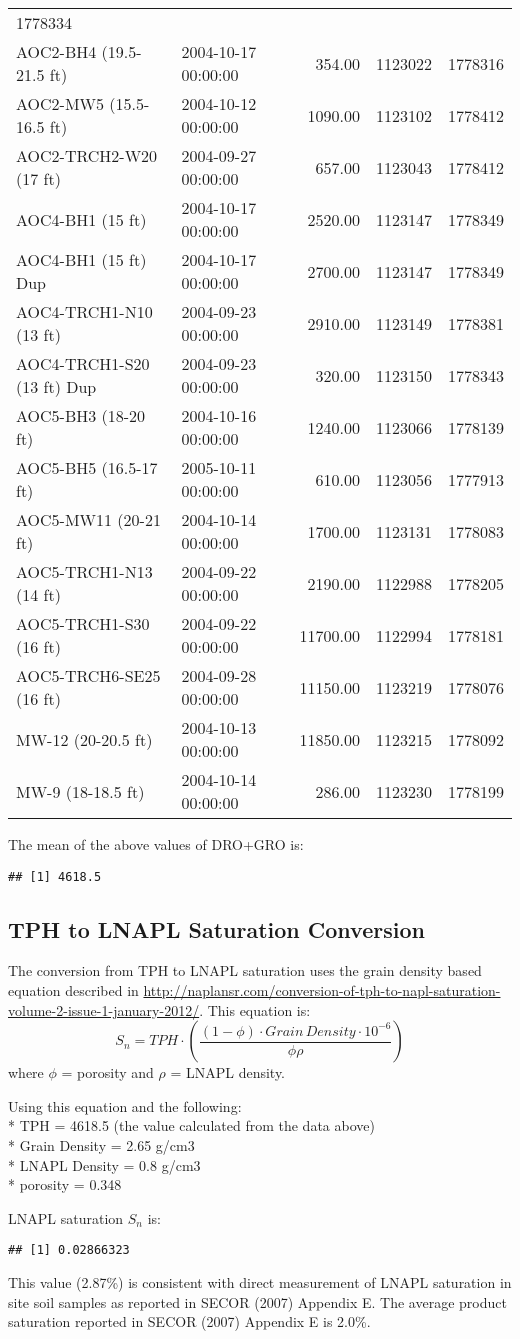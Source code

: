 \documentclass[
]{article}
\begin{document}
\begin{longtable}[]{@{}llrrr@{}}
1778334\tabularnewline
AOC2-BH4 (19.5-21.5 ft) & 2004-10-17 00:00:00 & 354.00 & 1123022 &
1778316\tabularnewline
AOC2-MW5 (15.5-16.5 ft) & 2004-10-12 00:00:00 & 1090.00 & 1123102 &
1778412\tabularnewline
AOC2-TRCH2-W20 (17 ft) & 2004-09-27 00:00:00 & 657.00 & 1123043 &
1778412\tabularnewline
AOC4-BH1 (15 ft) & 2004-10-17 00:00:00 & 2520.00 & 1123147 &
1778349\tabularnewline
AOC4-BH1 (15 ft) Dup & 2004-10-17 00:00:00 & 2700.00 & 1123147 &
1778349\tabularnewline
AOC4-TRCH1-N10 (13 ft) & 2004-09-23 00:00:00 & 2910.00 & 1123149 &
1778381\tabularnewline
AOC4-TRCH1-S20 (13 ft) Dup & 2004-09-23 00:00:00 & 320.00 & 1123150 &
1778343\tabularnewline
AOC5-BH3 (18-20 ft) & 2004-10-16 00:00:00 & 1240.00 & 1123066 &
1778139\tabularnewline
AOC5-BH5 (16.5-17 ft) & 2005-10-11 00:00:00 & 610.00 & 1123056 &
1777913\tabularnewline
AOC5-MW11 (20-21 ft) & 2004-10-14 00:00:00 & 1700.00 & 1123131 &
1778083\tabularnewline
AOC5-TRCH1-N13 (14 ft) & 2004-09-22 00:00:00 & 2190.00 & 1122988 &
1778205\tabularnewline
AOC5-TRCH1-S30 (16 ft) & 2004-09-22 00:00:00 & 11700.00 & 1122994 &
1778181\tabularnewline
AOC5-TRCH6-SE25 (16 ft) & 2004-09-28 00:00:00 & 11150.00 & 1123219 &
1778076\tabularnewline
MW-12 (20-20.5 ft) & 2004-10-13 00:00:00 & 11850.00 & 1123215 &
1778092\tabularnewline
MW-9 (18-18.5 ft) & 2004-10-14 00:00:00 & 286.00 & 1123230 &
1778199\tabularnewline
\bottomrule
\end{longtable}

The mean of the above values of DRO+GRO is:

\begin{verbatim}
## [1] 4618.5
\end{verbatim}

\hypertarget{tph-to-lnapl-saturation-conversion}{%
\subsection{TPH to LNAPL Saturation
Conversion}\label{tph-to-lnapl-saturation-conversion}}

The conversion from TPH to LNAPL saturation uses the grain density based
equation described in
\url{http://naplansr.com/conversion-of-tph-to-napl-saturation-volume-2-issue-1-january-2012/}.
This equation is:
\[S_n = TPH \cdot \left( \frac{(1-{\phi}) \cdot Grain \, Density \cdot 10^{-6}}{\phi\rho} \right)\]
where \(\phi\) = porosity and \(\rho\) = LNAPL density.

Using this equation and the following:\\
* TPH = 4618.5 (the value calculated from the data above)\\
* Grain Density = 2.65 g/cm3\\
* LNAPL Density = 0.8 g/cm3\\
* porosity = 0.348

LNAPL saturation \(S_n\) is:

\begin{verbatim}
## [1] 0.02866323
\end{verbatim}

This value (2.87\%) is consistent with direct measurement of LNAPL
saturation in site soil samples as reported in SECOR (2007) Appendix E.
The average product saturation reported in SECOR (2007) Appendix E is
2.0\%.
\end{document}
